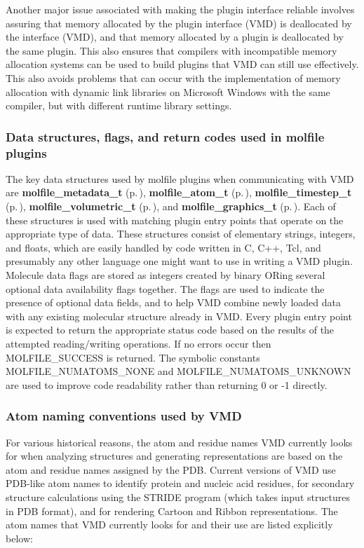 Another major issue associated with making the plugin interface reliable  involves assuring that memory allocated by the plugin interface (VMD) is  deallocated by the interface (VMD), and that memory allocated by a plugin  is deallocated by the same plugin. This also ensures that compilers with  incompatible memory allocation systems can be used to build plugins that  VMD can still use effectively. This also avoids problems that can occur  with the implementation of memory allocation with dynamic link libraries  on Microsoft Windows with the same compiler, but with different runtime library settings.



 \subsubsection*{Data structures, flags, and return codes used in molfile plugins}
 The key data structures used by molfile plugins when communicating with VMD are {\bf molfile\_\-metadata\_\-t} {\rm (p.\,\pageref{structmolfile__metadata__t})}, {\bf molfile\_\-atom\_\-t} {\rm (p.\,\pageref{structmolfile__atom__t})}, {\bf molfile\_\-timestep\_\-t} {\rm (p.\,\pageref{structmolfile__timestep__t})},  {\bf molfile\_\-volumetric\_\-t} {\rm (p.\,\pageref{structmolfile__volumetric__t})}, and {\bf molfile\_\-graphics\_\-t} {\rm (p.\,\pageref{structmolfile__graphics__t})}. Each of these structures is used with matching plugin entry points that operate on the appropriate type of data. These structures consist of elementary strings, integers, and floats, which are easily handled by code written in C, C++, Tcl, and  presumably any other language one might want to use in writing  a VMD plugin. Molecule data flags are stored as integers created by binary ORing  several optional data availability flags together. The flags are used to indicate the presence of optional data fields, and to help VMD  combine newly loaded data with any existing molecular structure already in VMD. Every plugin entry point is expected to return the appropriate  status code based on the results of the attempted reading/writing operations. If no errors occur then MOLFILE\_\-SUCCESS is returned. The symbolic constants MOLFILE\_\-NUMATOMS\_\-NONE and MOLFILE\_\-NUMATOMS\_\-UNKNOWN are used to improve code readability rather than returning 0 or -1 directly.



 \subsubsection*{Atom naming conventions used by VMD}
 For various historical reasons, the atom and residue names VMD currently  looks for when analyzing structures and generating representations are  based on the atom and residue names assigned by the PDB.  Current versions of VMD use PDB-like atom names to identify protein and nucleic acid residues, for secondary  structure calculations using the STRIDE program (which takes input  structures in PDB format), and for rendering Cartoon and Ribbon  representations. The atom names that VMD currently looks for and their use are listed explicitly below:


